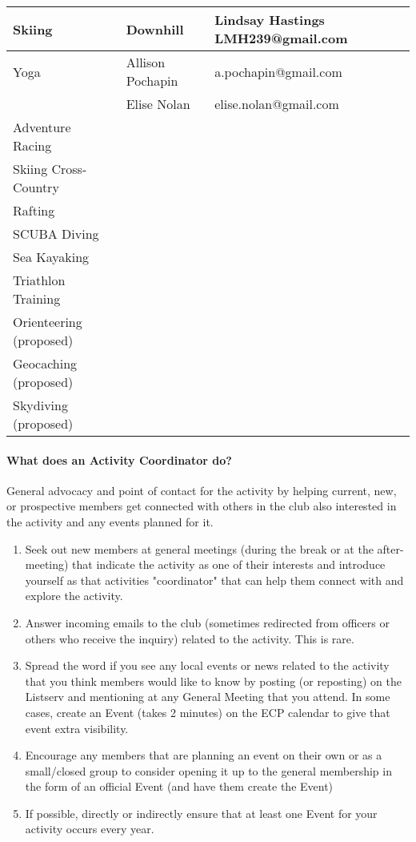 \documentclass[10pt,a4paper]{article}
\begin{document}
\begin{center}
\begin{tabular}{ | l | l | l | }
	Skiing & Downhill  &  Lindsay Hastings LMH239@gmail.com\\ \hline
	Yoga  &  Allison Pochapin & a.pochapin@gmail.com\\ \hline
            &  Elise Nolan & elise.nolan@gmail.com\\ \hline
	Adventure Racing & & \\ \hline
	Skiing  Cross-Country & & \\ \hline
	Rafting & & \\ \hline
	SCUBA Diving & & \\ \hline
	Sea Kayaking & & \\ \hline
	Triathlon Training & & \\ \hline
	Orienteering (proposed) & & \\ \hline
	Geocaching (proposed) & & \\ \hline
	Skydiving (proposed) & & \\ \hline
	 \hline
    \end{tabular}
\end{center}

\paragraph{What does an Activity Coordinator do?}
General advocacy and point of contact for the activity by helping current, new, or prospective members
get connected with others in the club also interested in the activity and any events planned for it.
\begin{enumerate}
\item Seek out new members at general meetings (during the break or at the after-meeting) that
indicate the activity as one of their interests and introduce yourself as that activities
"coordinator" that can help them connect with and explore the activity.
\item Answer incoming emails to the club (sometimes redirected from officers or others who receive
the inquiry) related to the activity. This is rare.
\item Spread the word if you see any local events or news related to the activity that you think
members would like to know by posting (or reposting) on the Listserv and mentioning at any
General Meeting that you attend. In some cases, create an Event (takes 2 minutes) on the ECP
calendar to give that event extra visibility.
\item Encourage any members that are planning an event on their own or as a small/closed group to
consider opening it up to the general membership in the form of an official Event (and have
them create the Event)
\item If possible, directly or indirectly ensure that at least one Event for your activity occurs every year.
\end{enumerate}
\end{document}

